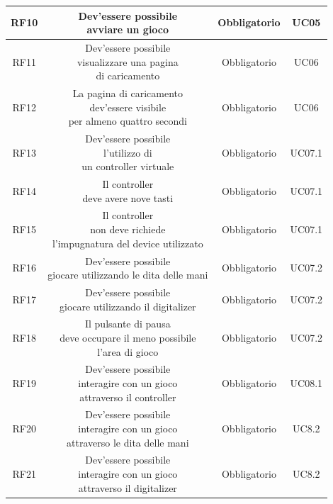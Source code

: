 \begin{longtable}{|c|c|c|c|}
    \hline
    RF10&\makecell{Dev'essere possibile \\ avviare un gioco}&Obbligatorio&UC05\\
    \hline
    RF11&\makecell{Dev'essere possibile \\ visualizzare una pagina \\ di caricamento}&Obbligatorio&UC06\\
    \hline
    RF12&\makecell{La pagina di caricamento \\ dev'essere visibile \\ per almeno quattro secondi}&Obbligatorio&UC06\\
    \hline
    RF13&\makecell{Dev'essere possibile \\ l'utilizzo di \\ un controller virtuale}&Obbligatorio&UC07.1\\
    \hline
    RF14&\makecell{Il controller \\ deve avere nove tasti}&Obbligatorio&UC07.1\\
    \hline
    RF15&\makecell{Il controller \\ non deve richiede \\ l'impugnatura del device utilizzato}&Obbligatorio&UC07.1\\
    \hline
    RF16&\makecell{Dev'essere possibile \\ giocare utilizzando le dita delle mani}&Obbligatorio&UC07.2\\
    \hline
    RF17&\makecell{Dev'essere possibile \\ giocare utilizzando il digitalizer}&Obbligatorio&UC07.2\\
    \hline
    RF18&\makecell{Il pulsante di pausa \\ deve occupare il meno possibile \\ l'area di gioco}&Obbligatorio&UC07.2\\
    \hline
    RF19&\makecell{Dev'essere possibile \\ interagire con un gioco \\ attraverso il controller}&Obbligatorio&UC08.1\\
    \hline
    RF20&\makecell{Dev'essere possibile \\ interagire con un gioco \\ attraverso le dita delle mani}&Obbligatorio&UC8.2\\
    \hline
    RF21&\makecell{Dev'essere possibile \\ interagire con un gioco \\ attraverso il digitalizer}&Obbligatorio&UC8.2\\

\end{longtable}
